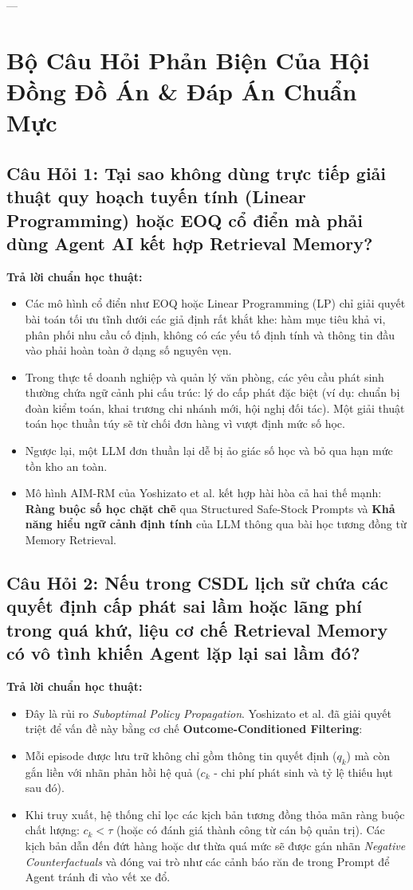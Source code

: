 \documentclass[11pt,a4paper]{article}
\begin{document}
---

\section{Bộ Câu Hỏi Phản Biện Của Hội Đồng Đồ Án \& Đáp Án Chuẩn Mực}

\subsection{Câu Hỏi 1: Tại sao không dùng trực tiếp giải thuật quy hoạch tuyến tính (Linear Programming) hoặc EOQ cổ điển mà phải dùng Agent AI kết hợp Retrieval Memory?}

\textbf{Trả lời chuẩn học thuật:}
\begin{itemize}[leftmargin=1.5em]
    \item Các mô hình cổ điển như EOQ hoặc Linear Programming (LP) chỉ giải quyết bài toán tối ưu tĩnh dưới các giả định rất khắt khe: hàm mục tiêu khả vi, phân phối nhu cầu cố định, không có các yếu tố định tính và thông tin đầu vào phải hoàn toàn ở dạng số nguyên vẹn.
    \item Trong thực tế doanh nghiệp và quản lý văn phòng, các yêu cầu phát sinh thường chứa ngữ cảnh phi cấu trúc: lý do cấp phát đặc biệt (ví dụ: chuẩn bị đoàn kiểm toán, khai trương chi nhánh mới, hội nghị đối tác). Một giải thuật toán học thuần túy sẽ từ chối đơn hàng vì vượt định mức số học.
    \item Ngược lại, một LLM đơn thuần lại dễ bị ảo giác số học và bỏ qua hạn mức tồn kho an toàn.
    \item Mô hình AIM-RM của Yoshizato et al. kết hợp hài hòa cả hai thế mạnh: \textbf{Ràng buộc số học chặt chẽ} qua Structured Safe-Stock Prompts và \textbf{Khả năng hiểu ngữ cảnh định tính} của LLM thông qua bài học tương đồng từ Memory Retrieval.
\end{itemize}

\subsection{Câu Hỏi 2: Nếu trong CSDL lịch sử chứa các quyết định cấp phát sai lầm hoặc lãng phí trong quá khứ, liệu cơ chế Retrieval Memory có vô tình khiến Agent lặp lại sai lầm đó?}

\textbf{Trả lời chuẩn học thuật:}
\begin{itemize}[leftmargin=1.5em]
    \item Đây là rủi ro \textit{Suboptimal Policy Propagation}. Yoshizato et al. đã giải quyết triệt để vấn đề này bằng cơ chế \textbf{Outcome-Conditioned Filtering}:
    \item Mỗi episode được lưu trữ không chỉ gồm thông tin quyết định ($q_k$) mà còn gắn liền với nhãn phản hồi hệ quả ($c_k$ - chi phí phát sinh và tỷ lệ thiếu hụt sau đó).
    \item Khi truy xuất, hệ thống chỉ lọc các kịch bản tương đồng thỏa mãn ràng buộc chất lượng: $c_k < \tau$ (hoặc có đánh giá thành công từ cán bộ quản trị). Các kịch bản dẫn đến đứt hàng hoặc dư thừa quá mức sẽ được gán nhãn \textit{Negative Counterfactuals} và đóng vai trò như các cảnh báo răn đe trong Prompt để Agent tránh đi vào vết xe đổ.
\end{itemize}
\end{document}
